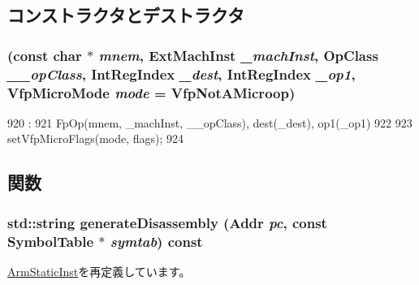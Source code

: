 \subsection{コンストラクタとデストラクタ}
\hypertarget{classArmISA_1_1FpRegRegOp_a54d3cb83ccd4f76c46dd318a0519f58f}{
\subsubsection[{FpRegRegOp}]{ (const char $\ast$ {\em mnem}, \/  {\bf ExtMachInst} {\em \_\-machInst}, \/  OpClass {\em \_\-\_\-opClass}, \/  {\bf IntRegIndex} {\em \_\-dest}, \/  {\bf IntRegIndex} {\em \_\-op1}, \/  {\bf VfpMicroMode} {\em mode} = {\ttfamily VfpNotAMicroop})}}
\label{classArmISA_1_1FpRegRegOp_a54d3cb83ccd4f76c46dd318a0519f58f}



\begin{DoxyCode}
920                                                    :
921         FpOp(mnem, _machInst, __opClass), dest(_dest), op1(_op1)
922     {
923         setVfpMicroFlags(mode, flags);
924     }

\end{DoxyCode}


\subsection{関数}
\hypertarget{classArmISA_1_1FpRegRegOp_a95d323a22a5f07e14d6b4c9385a91896}{
\subsubsection[{generateDisassembly}]{\setlength{\rightskip}{0pt plus 5cm}std::string generateDisassembly ({\bf Addr} {\em pc}, \/  const SymbolTable $\ast$ {\em symtab}) const}}
\label{classArmISA_1_1FpRegRegOp_a95d323a22a5f07e14d6b4c9385a91896}


\hyperlink{classArmISA_1_1ArmStaticInst_a95d323a22a5f07e14d6b4c9385a91896}{ArmStaticInst}を再定義しています。


